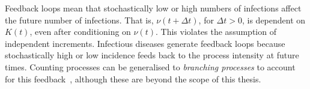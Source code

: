 \documentclass[thesis.tex]{subfiles}
\begin{document}

Feedback loops mean that stochastically low or high numbers of infections affect the future number of infections.
That is, $\nu(t+\Delta t)$, for $\Delta t > 0$, is dependent on $K(t)$, even after conditioning on $\nu(t)$.
This violates the assumption of independent increments.
Infectious diseases generate feedback loops because stochastically high or low incidence feeds back to the process intensity at future times.
Counting processes can be generalised to \emph{branching processes} to account for this feedback~\autocite[246]{yanDistribution}, although these are beyond the scope of this thesis.
\end{document}
